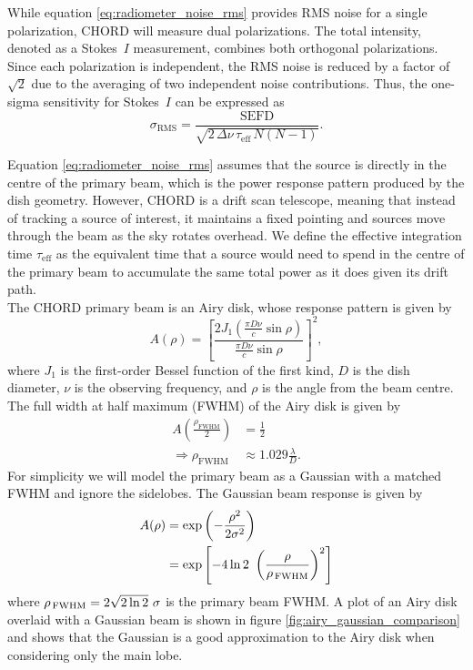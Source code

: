 While equation \ref{eq:radiometer_noise_rms} provides RMS noise for a single polarization, CHORD will measure dual polarizations. The total intensity, denoted as a Stokes~$I$ measurement, combines both orthogonal polarizations. Since each polarization is independent, the RMS noise is reduced by a factor of \(\sqrt{2}\) due to the averaging of two independent noise contributions. Thus, the one-sigma sensitivity for Stokes~$I$ can be expressed as
\begin{equation}
\sigma_{\mathrm{RMS}} = \frac{\mathrm{SEFD}}{\sqrt{2 \, \Delta \nu \, \tau_{\mathrm{eff}} \, N(N-1)}}.
\label{noise_rms}
\end{equation}

Equation \ref{eq:radiometer_noise_rms} assumes that the source is directly in the centre of the primary beam, which is the power response pattern produced by the dish geometry. However, CHORD is a drift scan telescope, meaning that instead of tracking a source of interest, it maintains a fixed pointing and sources move through the beam as the sky rotates overhead. We define the effective integration time \(\tau_{\mathrm{eff}}\) as the equivalent time that a source would need to spend in the centre of the primary beam to accumulate the same total power as it does given its drift path.\\

The CHORD primary beam is an Airy disk, whose response pattern is given by
\begin{equation}
    A(\rho) = \left[\frac{2 J_1\!\left(\frac{\pi D \nu}{c}\sin\rho\right)}{\frac{\pi D \nu}{c}\sin\rho}\right]^2,
\end{equation}
where $J_1$ is the first-order Bessel function of the first kind, $D$ is the dish diameter, $\nu$ is the observing frequency, and $\rho$ is the angle from the beam centre. The full width at half maximum (FWHM) of the Airy disk is given by 
\begin{align}
    A\left(\frac{\rho_{\mathrm{FWHM}}}{2}\right) &= \frac{1}{2} \\
    \Rightarrow \rho_{\mathrm{FWHM}} &\approx 1.029 \frac{\lambda}{D}.
\end{align}
For simplicity we will model the primary beam as a Gaussian with a matched FWHM and ignore the sidelobes. The Gaussian beam response is given by
\begin{align}
    A(\rho)
    &= \exp\left(-\frac{\rho^2}{2\sigma^2}\right) \\
    &= \exp\left[-4\ln2~\left (\frac{\rho}{\rho_{\, \mathrm{FWHM}}} \right )^2\right]
    \label{eq:gaussian_beam}
\end{align}
where $\rho_{\, \mathrm{FWHM}} = 2 \sqrt{2 \ln 2} ~\sigma$ is the primary beam FWHM. A plot of an Airy disk overlaid with a Gaussian beam is shown in figure \ref{fig:airy_gaussian_comparison} and shows that the Gaussian is a good approximation to the Airy disk when considering only the main lobe.
    
